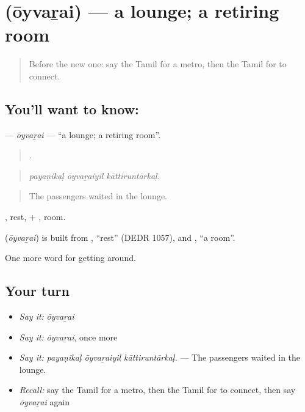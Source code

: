 \section[\texorpdfstring{\ta{ஓய்வறை} (ōyvaṟai)}{ஓய்வறை (ōyvaṟai)}]{ (ōyvaṟai) — a lounge; a retiring room}

\label{lesson:TA-C405-oyvarai}



\begin{quote}
Before the new one: say the Tamil for a metro, then the Tamil for to connect.
\end{quote}

\subsection*{You'll want to know: }
\textbf{} — \emph{ōyvaṟai} — \textquotedblleft{}a lounge; a retiring room\textquotedblright{}.

\begin{quote}
  .
\end{quote}

\begin{quote}
\emph{payaṇikaḷ ōyvaṟaiyil kāttiruntārkaḷ.}
\end{quote}

\begin{quote}
The passengers waited in the lounge.
\end{quote}

, rest, + , room.

\begin{cousinweb}
\textbf{} (\emph{ōyvaṟai}) is built from , \textquotedblleft{}rest\textquotedblright{} (DEDR 1057), and , \textquotedblleft{}a room\textquotedblright{}.
\end{cousinweb}

\begin{grammarlens}[title={What you've built}]
One more word for getting around.
\end{grammarlens}

\subsection*{Your turn}
\begin{itemize}
\raggedright
  \item \emph{Say it:} \emph{ōyvaṟai}
  \item \emph{Say it:} \emph{ōyvaṟai}, once more
  \item \emph{Say it:} \emph{payaṇikaḷ ōyvaṟaiyil kāttiruntārkaḷ.} — The passengers waited in the lounge.
  \item \emph{Recall:} say the Tamil for a metro, then the Tamil for to connect, then say \emph{ōyvaṟai} again
\end{itemize}

